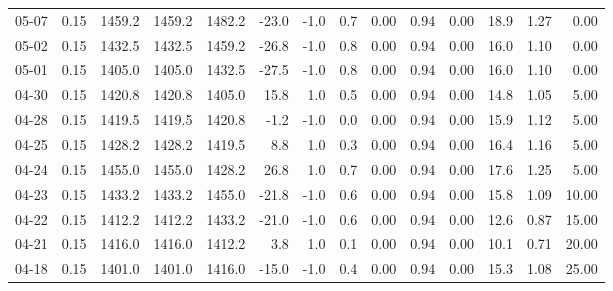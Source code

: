 \begin{threeparttable}
{\begin{tabular}{lrrrrrrrrrrrrr}
  05-07 &     0.15 & 1459.2 & 1459.2 & 1482.2 &      -23.0 &                     -1.0 &                 0.7 &       0.00 &      0.94 &           0.00 &             18.9 &            1.27 &                   0.00 \\
  05-02 &     0.15 & 1432.5 & 1432.5 & 1459.2 &      -26.8 &                     -1.0 &                 0.8 &       0.00 &      0.94 &           0.00 &             16.0 &            1.10 &                   0.00 \\
  05-01 &     0.15 & 1405.0 & 1405.0 & 1432.5 &      -27.5 &                     -1.0 &                 0.8 &       0.00 &      0.94 &           0.00 &             16.0 &            1.10 &                   0.00 \\
  04-30 &     0.15 & 1420.8 & 1420.8 & 1405.0 &       15.8 &                      1.0 &                 0.5 &       0.00 &      0.94 &           0.00 &             14.8 &            1.05 &                   5.00 \\
  04-28 &     0.15 & 1419.5 & 1419.5 & 1420.8 &       -1.2 &                     -1.0 &                 0.0 &       0.00 &      0.94 &           0.00 &             15.9 &            1.12 &                   5.00 \\
  04-25 &     0.15 & 1428.2 & 1428.2 & 1419.5 &        8.8 &                      1.0 &                 0.3 &       0.00 &      0.94 &           0.00 &             16.4 &            1.16 &                   5.00 \\
  04-24 &     0.15 & 1455.0 & 1455.0 & 1428.2 &       26.8 &                      1.0 &                 0.7 &       0.00 &      0.94 &           0.00 &             17.6 &            1.25 &                   5.00 \\
  04-23 &     0.15 & 1433.2 & 1433.2 & 1455.0 &      -21.8 &                     -1.0 &                 0.6 &       0.00 &      0.94 &           0.00 &             15.8 &            1.09 &                  10.00 \\
  04-22 &     0.15 & 1412.2 & 1412.2 & 1433.2 &      -21.0 &                     -1.0 &                 0.6 &       0.00 &      0.94 &           0.00 &             12.6 &            0.87 &                  15.00 \\
  04-21 &     0.15 & 1416.0 & 1416.0 & 1412.2 &        3.8 &                      1.0 &                 0.1 &       0.00 &      0.94 &           0.00 &             10.1 &            0.71 &                  20.00 \\
  04-18 &     0.15 & 1401.0 & 1401.0 & 1416.0 &      -15.0 &                     -1.0 &                 0.4 &       0.00 &      0.94 &           0.00 &             15.3 &            1.08 &                  25.00 \\

\end{tabular}}
\end{threeparttable}
